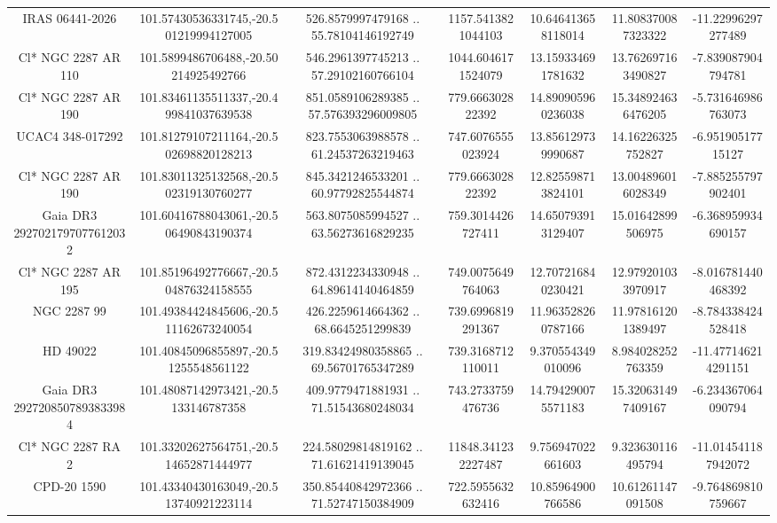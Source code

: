 \begin{table}
\begin{tabular}{ccccccc}
IRAS 06441-2026 & 101.57430536331745,-20.501219994127005 & 526.8579997479168 .. 55.78104146192749 & 1157.5413821044103 & 10.646413658118014 & 11.808370087323322 & -11.22996297277489 \\
Cl* NGC 2287     AR     110 & 101.5899486706488,-20.50214925492766 & 546.2961397745213 .. 57.29102160766104 & 1044.6046171524079 & 13.159334691781632 & 13.762697163490827 & -7.839087904794781 \\
Cl* NGC 2287     AR     190 & 101.83461135511337,-20.499841037639538 & 851.0589106289385 .. 57.576393296009805 & 779.666302822392 & 14.890905960236038 & 15.348924636476205 & -5.731646986763073 \\
UCAC4 348-017292 & 101.81279107211164,-20.502698820128213 & 823.7553063988578 .. 61.24537263219463 & 747.6076555023924 & 13.856129739990687 & 14.16226325752827 & -6.95190517715127 \\
Cl* NGC 2287     AR     190 & 101.83011325132568,-20.502319130760277 & 845.3421246533201 .. 60.97792825544874 & 779.666302822392 & 12.825598713824101 & 13.004896016028349 & -7.885255797902401 \\
Gaia DR3 2927021797077612032 & 101.60416788043061,-20.506490843190374 & 563.8075085994527 .. 63.56273616829235 & 759.3014426727411 & 14.650793913129407 & 15.01642899506975 & -6.368959934690157 \\
Cl* NGC 2287     AR     195 & 101.85196492776667,-20.504876324158555 & 872.4312234330948 .. 64.89614140464859 & 749.0075649764063 & 12.707216840230421 & 12.979201033970917 & -8.016781440468392 \\
NGC  2287    99 & 101.49384424845606,-20.511162673240054 & 426.2259614664362 .. 68.6645251299839 & 739.6996819291367 & 11.963528260787166 & 11.978161201389497 & -8.784338424528418 \\
HD  49022 & 101.40845096855897,-20.51255548561122 & 319.83424980358865 .. 69.56701765347289 & 739.3168712110011 & 9.370554349010096 & 8.984028252763359 & -11.477146214291151 \\
Gaia DR3 2927208507893833984 & 101.48087142973421,-20.5133146787358 & 409.9779471881931 .. 71.51543680248034 & 743.2733759476736 & 14.794290075571183 & 15.320631497409167 & -6.234367064090794 \\
Cl* NGC 2287     RA       2 & 101.33202627564751,-20.514652871444977 & 224.58029814819162 .. 71.61621419139045 & 11848.341232227487 & 9.756947022661603 & 9.323630116495794 & -11.014541187942072 \\
CPD-20  1590 & 101.43340430163049,-20.513740921223114 & 350.85440842972366 .. 71.52747150384909 & 722.5955632632416 & 10.85964900766586 & 10.61261147091508 & -9.764869810759667 \\

\end{tabular}
\end{table}
